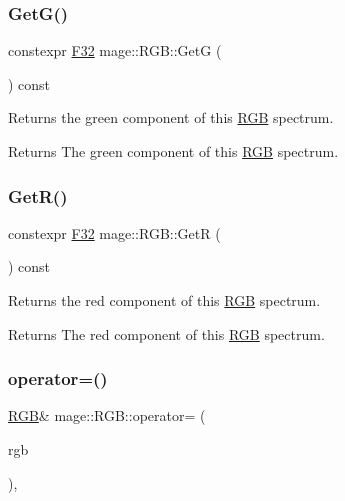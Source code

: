 \subsubsection{\texorpdfstring{Get\+G()}{GetG()}}
{\footnotesize\ttfamily constexpr \mbox{\hyperlink{namespacemage_aa97e833b45f06d60a0a9c4fc22ae02c0}{F32}} mage\+::\+R\+G\+B\+::\+GetG (\begin{DoxyParamCaption}{ }\end{DoxyParamCaption}) const\hspace{0.3cm}{\ttfamily [noexcept]}}

Returns the green component of this \mbox{\hyperlink{structmage_1_1_r_g_b}{R\+GB}} spectrum.

\begin{DoxyReturn}{Returns}
The green component of this \mbox{\hyperlink{structmage_1_1_r_g_b}{R\+GB}} spectrum. 
\end{DoxyReturn}
\mbox{\label{structmage_1_1_r_g_b_a314530cf81692c9f49da663ba51ea528}} 
\subsubsection{\texorpdfstring{Get\+R()}{GetR()}}
{\footnotesize\ttfamily constexpr \mbox{\hyperlink{namespacemage_aa97e833b45f06d60a0a9c4fc22ae02c0}{F32}} mage\+::\+R\+G\+B\+::\+GetR (\begin{DoxyParamCaption}{ }\end{DoxyParamCaption}) const\hspace{0.3cm}{\ttfamily [noexcept]}}

Returns the red component of this \mbox{\hyperlink{structmage_1_1_r_g_b}{R\+GB}} spectrum.

\begin{DoxyReturn}{Returns}
The red component of this \mbox{\hyperlink{structmage_1_1_r_g_b}{R\+GB}} spectrum. 
\end{DoxyReturn}
\mbox{\label{structmage_1_1_r_g_b_a10fd47397bb4a691c951d44abfb77d7c}} 
\subsubsection{\texorpdfstring{operator=()}{operator=()}\hspace{0.1cm}{\footnotesize\ttfamily [1/2]}}
{\footnotesize\ttfamily \mbox{\hyperlink{structmage_1_1_r_g_b}{R\+GB}}\& mage\+::\+R\+G\+B\+::operator= (\begin{DoxyParamCaption}\item[{const \mbox{\hyperlink{structmage_1_1_r_g_b}{R\+GB}} \&}]{rgb }\end{DoxyParamCaption})\hspace{0.3cm}{\ttfamily [default]}, {\ttfamily [noexcept]}}

